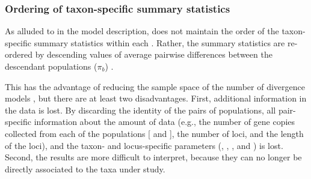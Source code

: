 \subsubsection{Ordering of taxon-specific summary statistics}
As alluded to in the model description, \msb does not maintain the order of the
taxon-specific summary statistics \alignmentSS{}{} within each \ssVector{}.
Rather, the summary statistics are re-ordered by descending values of average
pairwise differences between the descendant populations
($\pi_b$) \cite{NeiLi1979,Huang2011}.

This has the advantage of reducing the sample space of the number of
divergence models \divTimeIndexVector, but there are at least two disadvantages.
First, additional information in the data is lost.
By discarding the identity of the \npairs{} pairs of populations, all
pair-specific information about the amount of data (e.g., the number of gene
copies collected from each of the populations [ and
], the number of loci, and the length of the loci), and the
taxon- and locus-specific parameters (\hkyModel{}{},
\mutationRateScalarConstant{}{}, \ploidyScalar{}{}, and
\locusMutationRateScalar{}) is lost.
Second, the results are more difficult to interpret, because they can no
longer be directly associated to the taxa under study.

